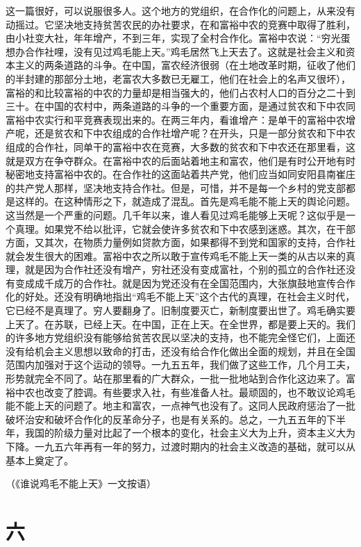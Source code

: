 这一篇很好，可以说服很多人。这个地方的党组织，在合作化的问题上，从来没有动摇过。它坚决地支持贫苦农民的办社要求，在和富裕中农的竞赛中取得了胜利，由小社变大社，年年增产，不到三年，实现了全村合作化。富裕中农说：“穷光蛋想办合作社哩，没有见过鸡毛能上天。”鸡毛居然飞上天去了。这就是社会主义和资本主义的两条道路的斗争。在中国，富农经济很弱（在土地改革时期，征收了他们的半封建的那部分土地，老富农大多数已无雇工，他们在社会上的名声又很坏），富裕的和比较富裕的中农的力量却是相当强大的，他们占农村人口的百分之二十到三十。在中国的农村中，两条道路的斗争的一个重要方面，是通过贫农和下中农同富裕中农实行和平竞赛表现出来的。在两三年内，看谁增产：是单干的富裕中农增产呢，还是贫农和下中农组成的合作社增产呢？在开头，只是一部分贫农和下中农组成的合作社，同单干的富裕中农在竞赛，大多数的贫农和下中农还在那里看，这就是双方在争夺群众。在富裕中农的后面站着地主和富农，他们是有时公开地有时秘密地支持富裕中农的。在合作社的这面站着共产党，他们应当如同安阳县南崔庄的共产党人那样，坚决地支持合作社。但是，可惜，并不是每一个乡村的党支部都是这样的。在这种情形之下，就造成了混乱。首先是鸡毛能不能上天的舆论问题。这当然是一个严重的问题。几千年以来，谁人看见过鸡毛能够上天呢？这似乎是一个真理。如果党不给以批评，它就会使许多贫农和下中农感到迷惑。其次，在干部方面，又其次，在物质力量例如贷款方面，如果都得不到党和国家的支持，合作社就会发生很大的困难。富裕中农之所以敢于宣传鸡毛不能上天一类的从古以来的真理，就是因为合作社还没有增产，穷社还没有变成富社，个别的孤立的合作社还没有变成成千成万的合作社。就是因为党还没有在全国范围内，大张旗鼓地宣传合作化的好处。还没有明确地指出“鸡毛不能上天”这个古代的真理，在社会主义时代，它已经不是真理了。穷人要翻身了。旧制度要灭亡，新制度要出世了。鸡毛确实要上天了。在苏联，已经上天。在中国，正在上天。在全世界，都是要上天的。我们的许多地方党组织没有能够给贫苦农民以坚决的支持，也不能完全怪它们，上面还没有给机会主义思想以致命的打击，还没有给合作化做出全面的规划，并且在全国范围内加强对于这个运动的领导。一九五五年，我们做了这些工作，几个月工夫，形势就完全不同了。站在那里看的广大群众，一批一批地站到合作化这边来了。富裕中农也改变了腔调。有些要求入社，有些准备人社。最顽固的，也不敢议论鸡毛能不能上天的问题了。地主和富农，一点神气也没有了。这同人民政府惩治了一批破坏治安和破坏合作化的反革命分子，也是有关系的。总之，一九五五年的下半年，我国的阶级力量对比起了一个根本的变化，社会主义大为上升，资本主义大为下降。一九五六年再有一年的努力，过渡时期内的社会主义改造的基础，就可以从基本上奠定了。


（《谁说鸡毛不能上天》一文按语）

\section*{六}


